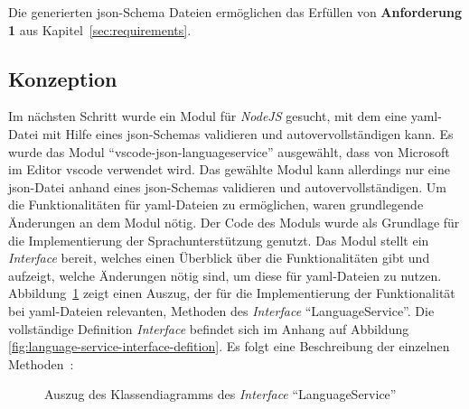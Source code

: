 Die generierten \ac{json}-Schema Dateien ermöglichen das Erfüllen von \textbf{Anforderung 1} aus Kapitel~\ref{sec:requirements}.

\subsection{Konzeption}

Im nächsten Schritt wurde ein Modul für \textit{NodeJS} gesucht, mit dem eine \ac{yaml}-Datei mit Hilfe eines \ac{json}-Schemas validieren
und autovervollständigen kann. Es wurde das Modul ``vscode-json-languageservice'' ausgewählt, dass von Microsoft im Editor \ac{vscode} verwendet
wird. Das gewählte Modul kann allerdings nur eine \ac{json}-Datei anhand eines \ac{json}-Schemas validieren
und autovervollständigen. Um die Funktionalitäten für \ac{yaml}-Dateien zu ermöglichen, waren grundlegende Änderungen an dem Modul nötig.
Der Code des Moduls wurde als Grundlage für die Implementierung der Sprachunterstützung genutzt.
Das Modul stellt ein \textit{Interface} bereit, welches einen Überblick über die Funktionalitäten gibt und aufzeigt, welche Änderungen
nötig sind, um diese für \ac{yaml}-Dateien zu nutzen.
\\
Abbildung~\ref{fig:language-service-interface-defition-excerpt} zeigt einen Auszug, der für die Implementierung
der Funktionalität bei \ac{yaml}-Dateien relevanten, Methoden des \textit{Interface} ``LanguageService''.
Die vollständige Definition \textit{Interface} befindet sich im Anhang auf Abbildung \ref{fig:language-service-interface-defition}.
Es folgt eine Beschreibung der einzelnen Methoden~\cite{vscode-json-language-service}:

\begin{figure}[htp] %
      \centering
      \caption{Auszug des Klassendiagramms des \textit{Interface} ``LanguageService''}
      \label{fig:language-service-interface-defition-excerpt}
\end{figure}



